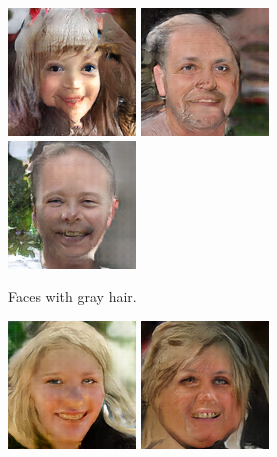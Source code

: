 \begin{figure}[!h]
\begin{subfigure}[b]{\textwidth}
{            \includegraphics[scale=0.485]{figures/ffhq/labeled-hair-gray/ffhq128x128_image028.png}
            \includegraphics[scale=0.485]{figures/ffhq/labeled-hair-gray/ffhq128x128_image049.png}
            \includegraphics[scale=0.485]{figures/ffhq/labeled-hair-gray/ffhq128x128_image051.png}
        }
        \caption{Faces with gray hair.}
        \vspace{0.1cm}
    \end{subfigure}
    \begin{subfigure}[b]{\textwidth}
        \centerline{
            \includegraphics[scale=0.485]{figures/ffhq/labeled-hair-blonde/ffhq128x128_image009.png}
            \includegraphics[scale=0.485]{figures/ffhq/labeled-hair-blonde/ffhq128x128_image012.png}
}
\end{subfigure}
\end{figure}

